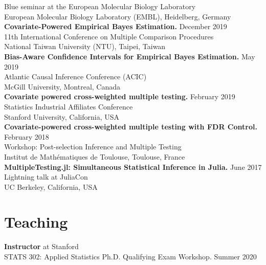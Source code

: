 \documentclass[margin,line]{res}
\begin{document}
\begin{resume}
Blue seminar at the European Molecular Biology Laboratory\\
European Molecular Biology Laboratory (EMBL), Heidelberg, Germany\\
\textbf{Covariate-Powered Empirical Bayes Estimation.} \hfill December 2019\\
11th International Conference on Multiple Comparison Procedures\\
National Taiwan University (NTU), Taipei, Taiwan\\
\textbf{Bias-Aware Confidence Intervals for Empirical Bayes Estimation.} \hfill May 2019\\
Atlantic Causal Inference Conference (ACIC)\\
McGill University, Montreal, Canada\\
\textbf{Covariate powered cross-weighted multiple testing.} \hfill February 2019\\
Statistics Industrial Affiliates Conference\\
Stanford University, California, USA\\
\textbf{Covariate-powered cross-weighted multiple testing with FDR Control.} \hfill February 2018\\
Workshop: Post-selection Inference and Multiple Testing\\
Institut de Mathématiques de Toulouse, Toulouse, France\\
\textbf{MultipleTesting.jl: Simultaneous Statistical Inference in Julia.} \hfill June 2017\\
Lightning talk at JuliaCon\\
UC Berkeley, California, USA





\section{\sc Teaching}
\textbf{Instructor} at Stanford\\
STATS 302: Applied Statistics Ph.D. Qualifying Exam Workshop. \hfill Summer 2020


\end{resume}
\end{document}
